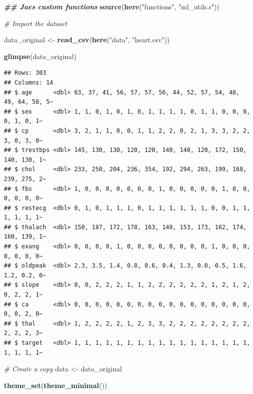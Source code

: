 \documentclass[
]{book}
\newenvironment{Shaded}{\begin{snugshade}}{\end{snugshade}}
\newcommand{\CommentTok}[1]{\textcolor[rgb]{0.56,0.35,0.01}{\textit{#1}}}
\newcommand{\DocumentationTok}[1]{\textcolor[rgb]{0.56,0.35,0.01}{\textbf{\textit{#1}}}}
\newcommand{\FunctionTok}[1]{\textcolor[rgb]{0.13,0.29,0.53}{\textbf{#1}}}
\newcommand{\NormalTok}[1]{#1}
\newcommand{\OtherTok}[1]{\textcolor[rgb]{0.56,0.35,0.01}{#1}}
\newcommand{\StringTok}[1]{\textcolor[rgb]{0.31,0.60,0.02}{#1}}
\begin{document}
\begin{Shaded}
\begin{Highlighting}[]
\DocumentationTok{\#\# Jae\textquotesingle{}s custom functions}
\FunctionTok{source}\NormalTok{(}\FunctionTok{here}\NormalTok{(}\StringTok{"functions"}\NormalTok{, }\StringTok{"ml\_utils.r"}\NormalTok{))}

\CommentTok{\# Import the dataset}

\NormalTok{data\_original }\OtherTok{\textless{}{-}} \FunctionTok{read\_csv}\NormalTok{(}\FunctionTok{here}\NormalTok{(}\StringTok{"data"}\NormalTok{, }\StringTok{"heart.csv"}\NormalTok{))}

\FunctionTok{glimpse}\NormalTok{(data\_original)}
\end{Highlighting}
\end{Shaded}

\begin{verbatim}
## Rows: 303
## Columns: 14
## $ age      <dbl> 63, 37, 41, 56, 57, 57, 56, 44, 52, 57, 54, 48, 49, 64, 58, 5~
## $ sex      <dbl> 1, 1, 0, 1, 0, 1, 0, 1, 1, 1, 1, 0, 1, 1, 0, 0, 0, 0, 1, 0, 1~
## $ cp       <dbl> 3, 2, 1, 1, 0, 0, 1, 1, 2, 2, 0, 2, 1, 3, 3, 2, 2, 3, 0, 3, 0~
## $ trestbps <dbl> 145, 130, 130, 120, 120, 140, 140, 120, 172, 150, 140, 130, 1~
## $ chol     <dbl> 233, 250, 204, 236, 354, 192, 294, 263, 199, 168, 239, 275, 2~
## $ fbs      <dbl> 1, 0, 0, 0, 0, 0, 0, 0, 1, 0, 0, 0, 0, 0, 1, 0, 0, 0, 0, 0, 0~
## $ restecg  <dbl> 0, 1, 0, 1, 1, 1, 0, 1, 1, 1, 1, 1, 1, 0, 0, 1, 1, 1, 1, 1, 1~
## $ thalach  <dbl> 150, 187, 172, 178, 163, 148, 153, 173, 162, 174, 160, 139, 1~
## $ exang    <dbl> 0, 0, 0, 0, 1, 0, 0, 0, 0, 0, 0, 0, 0, 1, 0, 0, 0, 0, 0, 0, 0~
## $ oldpeak  <dbl> 2.3, 3.5, 1.4, 0.8, 0.6, 0.4, 1.3, 0.0, 0.5, 1.6, 1.2, 0.2, 0~
## $ slope    <dbl> 0, 0, 2, 2, 2, 1, 1, 2, 2, 2, 2, 2, 2, 1, 2, 1, 2, 0, 2, 2, 1~
## $ ca       <dbl> 0, 0, 0, 0, 0, 0, 0, 0, 0, 0, 0, 0, 0, 0, 0, 0, 0, 0, 0, 2, 0~
## $ thal     <dbl> 1, 2, 2, 2, 2, 1, 2, 3, 3, 2, 2, 2, 2, 2, 2, 2, 2, 2, 2, 2, 3~
## $ target   <dbl> 1, 1, 1, 1, 1, 1, 1, 1, 1, 1, 1, 1, 1, 1, 1, 1, 1, 1, 1, 1, 1~
\end{verbatim}

\begin{Shaded}
\begin{Highlighting}[]
\CommentTok{\# Create a copy}
\NormalTok{data }\OtherTok{\textless{}{-}}\NormalTok{ data\_original}

\FunctionTok{theme\_set}\NormalTok{(}\FunctionTok{theme\_minimal}\NormalTok{())}
\end{Highlighting}
\end{Shaded}
\end{document}
